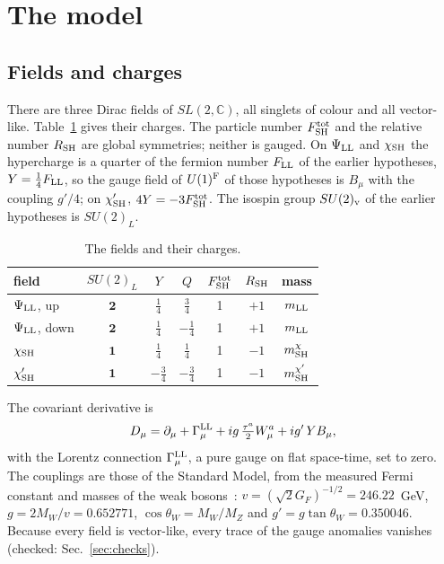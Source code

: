 \documentclass[aps,prd,onecolumn,superscriptaddress,nofootinbib,floatfix,longbibliography]{revtex4-2}
\newcommand{\LL}{{\rm LL}}
\newcommand{\SH}{{\rm SH}}
\begin{document}
\section{The model}
\label{sec:model}

\subsection{Fields and charges}

There are three Dirac fields of $SL(2,\mathbb C)$, all singlets of colour and all vector-like. Table~\ref{tab:fields} gives
their charges. The particle number $F^{\rm tot}_\SH$ and the relative number $R_\SH$ are global symmetries; neither is
gauged. On $\Psi_\LL$ and $\chi_\SH$ the hypercharge is a quarter of the fermion number $F_\LL$ of the earlier hypotheses,
$Y=\frac14F_\LL$, so the gauge field of $U(1)^{\rm F}$ of those hypotheses is $B_\mu$ with the coupling $g'/4$; on
$\chi'_\SH$, $4Y=-3F^{\rm tot}_\SH$. The isospin group $SU(2)_{\rm v}$ of the earlier hypotheses is $SU(2)_L$.

\begin{table}[h]
\caption{\label{tab:fields}The fields and their charges.}
\begin{ruledtabular}
\begin{tabular}{lcccccc}
field & $SU(2)_L$ & $Y$ & $Q$ & $F^{\rm tot}_\SH$ & $R_\SH$ & mass\\
\hline
$\Psi_\LL$, up & $\mathbf 2$ & $\frac14$ & $\frac34$ & 1 & $+1$ & $m_\LL$\\
$\Psi_\LL$, down & $\mathbf 2$ & $\frac14$ & $-\frac14$ & 1 & $+1$ & $m_\LL$\\
$\chi_\SH$ & $\mathbf 1$ & $\frac14$ & $\frac14$ & 1 & $-1$ & $m^\chi_\SH$\\
$\chi'_\SH$ & $\mathbf 1$ & $-\frac34$ & $-\frac34$ & 1 & $-1$ & $m^{\chi'}_\SH$\\
\end{tabular}
\end{ruledtabular}
\end{table}

The covariant derivative is
\begin{equation}
D_\mu=\partial_\mu+\Gamma^\LL_\mu+ig\,\tfrac{\tau^a}{2}W^a_\mu+ig'\,YB_\mu ,
\label{eq:cov}
\end{equation}
with the Lorentz connection $\Gamma^\LL_\mu$, a pure gauge on flat space-time, set to zero. The couplings are those of the
Standard Model, from the measured Fermi constant and masses of the weak bosons~\cite{PDG2026}:
$v=(\sqrt2G_F)^{-1/2}=246.22$~GeV, $g=2M_W/v=0.652771$, $\cos\theta_W=M_W/M_Z$ and $g'=g\tan\theta_W=0.350046$.
Because every field is vector-like, every trace of the gauge anomalies vanishes (checked:
Sec.~\ref{sec:checks}).
\end{document}
